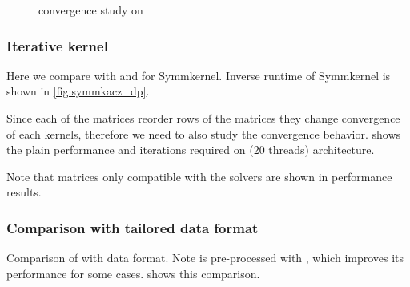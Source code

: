 \begin{figure}[thbp]
	\centering
	\hspace{1em}
	\caption{\SYMMKACZ convergence study on \SKX}
	\label{fig:symmkacz_convergence}
\end{figure}
\subsubsection{Iterative kernel}
Here we compare  \RACE with \ABMC and \MC for Symm\KACZ kernel. Inverse runtime of Symm\KACZ kernel is shown in \cref{fig:symmkacz_dp}.

 Since each of the matrices reorder rows of the matrices they change convergence of each kernels, therefore we need to also study the convergence behavior.  shows the plain performance and iterations required on \SKX (20 threads) architecture.

Note that matrices only compatible with the \KACZ solvers are shown in performance results.




\subsubsection{Comparison with tailored data format}
Comparison of \RACE with \RSB data format. Note \RSB is pre-processed with \RCM, which improves its performance for some cases.  shows this comparison.

